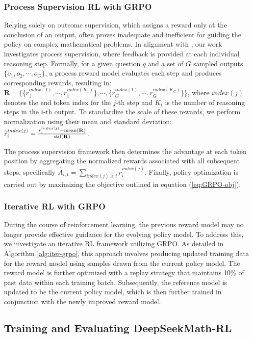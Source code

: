 \begin{itemize}[topsep=0pt]
\begin{itemize}[topsep=0pt]
\subsubsection{Process Supervision RL with GRPO} 

Relying solely on outcome supervision, which assigns a reward only at the conclusion of an output, often proves inadequate and inefficient for guiding the policy on complex mathematical problems. In alignment with \cite{wang2023math}, our work investigates process supervision, where feedback is provided at each individual reasoning step. Formally, for a given question $q$ and a set of $G$ sampled outputs $\{o_1, o_2, \cdots, o_G\}$, a process reward model evaluates each step and produces corresponding rewards, resulting in: $\mathbf{R} = \{ \{r_1^{index(1)},\cdots,r_1^{index(K_1)}\}, \cdots,  \{r_G^{index(1)},\cdots,r_G^{index(K_G)}\} \}$, where $index(j)$ denotes the end token index for the $j$-th step and $K_i$ is the number of reasoning steps in the $i$-th output. To standardize the scale of these rewards, we perform normalization using their mean and standard deviation: $\widetilde{r}_i^{index(j)} = \frac{r_i^{index(j)} - {\rm mean(\mathbf{R})}}{{\rm std(\mathbf{R})}}$.

The process supervision framework then determines the advantage at each token position by aggregating the normalized rewards associated with all subsequent steps, specifically $\hat{A}_{i, t} = \sum_{index(j) \ge t} \widetilde{r}_i^{index(j)}$. Finally, policy optimization is carried out by maximizing the objective outlined in equation (\ref{eq:GRPO-obj}).

\subsubsection{Iterative RL with GRPO} During the course of reinforcement learning, the previous reward model may no longer provide effective guidance for the evolving policy model. To address this, we investigate an iterative RL framework utilizing GRPO. As detailed in Algorithm \ref{alg:iter-grpo}, this approach involves producing updated training data for the reward model using samples drawn from the current policy model. The reward model is further optimized with a replay strategy that maintains 10\% of past data within each training batch. Subsequently, the reference model is updated to be the current policy model, which is then further trained in conjunction with the newly improved reward model.

\subsection{Training and Evaluating DeepSeekMath-RL}


\end{itemize}
\end{itemize}
